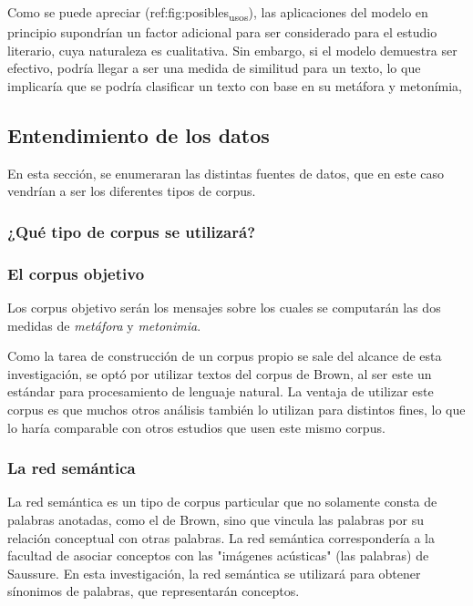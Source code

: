 \documentclass[twoside]{article}
\begin{document}
Como se puede apreciar (ref:fig:posibles\textsubscript{usos}), las aplicaciones del modelo en principio
supondrían un factor adicional para ser considerado para el
estudio literario, cuya naturaleza es cualitativa. Sin embargo, si
el modelo demuestra ser efectivo, podría llegar a ser una medida
de similitud para un texto, lo que implicaría que se podría
clasificar un texto con base en su metáfora y metonímia, 


\subsection{Entendimiento de los datos}
\label{sec:orgd69dbd0}

En esta sección, se enumeraran las distintas fuentes de datos,
que en este caso vendrían a ser los diferentes tipos de corpus.
\subsubsection{¿Qué tipo de corpus se utilizará?}
\label{sec:orgd63fb79}





\subsubsection{El corpus objetivo}
\label{sec:orgc235c9a}

Los corpus objetivo serán los mensajes sobre los cuales se
computarán las dos medidas de \emph{metáfora} y \emph{metonimia}.

Como la tarea de construcción de un corpus propio se sale
del alcance de esta investigación, se optó por utilizar
textos del corpus de Brown, al ser este un estándar
para procesamiento de lenguaje natural. La ventaja
de utilizar este corpus es que muchos otros análisis
también lo utilizan para distintos fines, lo que
lo haría comparable con otros estudios que usen
este mismo corpus.

\subsubsection{La red semántica}
\label{sec:org0dbc5cc}

La red semántica es un tipo de corpus particular que no solamente
consta de palabras anotadas, como el de Brown, sino que vincula
las palabras por su relación conceptual con otras palabras. La
red semántica correspondería a la facultad de asociar conceptos
con las "imágenes acústicas" (las palabras) de Saussure. En esta
investigación, la red semántica se utilizará para obtener
sínonimos de palabras, que representarán conceptos.
\end{document}
